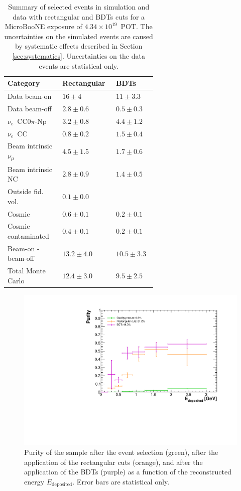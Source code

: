 \begin{table}[htbp]
   \centering
      \caption{Summary of selected events in simulation and data with rectangular and BDTs cuts for a MicroBooNE exposure of $4.34\times10^{19}$~POT. The uncertainties on the simulated events are caused by systematic effects described in Section \ref{sec:systematics}. Uncertainties on the data events are statistical only.}\label{tab:overview}
   \begin{tabular}{
   p{0.27\linewidth}
   >{\raggedleft\arraybackslash}p{0.16\linewidth}
   >{\raggedleft\arraybackslash}p{0.16\linewidth}}
     \toprule
     Category & Rectangular & BDTs \\
     \midrule
     Data beam-on & $16\pm4$ & $11\pm3.3$ \\
     Data beam-off & $2.8\pm0.6$ & $0.5\pm0.3$ \\
     $\nu_e$~CC0$\pi$-Np & $3.2\pm0.8$ & $4.4\pm1.2$\\
     $\nu_e$~CC & $0.8\pm0.2$ & $1.5\pm0.4$ \\
     Beam intrinsic $\nu_{\mu}$ & $4.5\pm1.5$ & $1.7\pm0.6$ \\
     Beam intrinsic NC & $2.8\pm0.9$ & $1.4\pm0.5$ \\
     Outside fid. vol. & $0.1\pm0.0$ & 0 \\
     Cosmic & $0.6\pm0.1$ & $0.2\pm0.1$ \\
     Cosmic contaminated & $0.4\pm0.1$ & $0.2\pm0.1$ \\
     \midrule
     Beam-on - beam-off & $13.2\pm4.0$ & $10.5\pm3.3$ \\
     Total Monte Carlo & $12.4\pm3.0$ & $9.5\pm2.5$ \\
     \bottomrule
   \end{tabular}
\end{table}


\begin{figure}[htbp]
\centering
  \includegraphics[width=0.75\linewidth]{figures/purity_bdt.pdf}
  \caption{Purity of the sample after the event selection (green), after the application of the rectangular cuts (orange), and after the application of the BDTs (purple) as a function of the reconstructed energy $E_{\mathrm{deposited}}$. Error bars are statistical only.}\label{fig:purity_bdt}
\end{figure}

